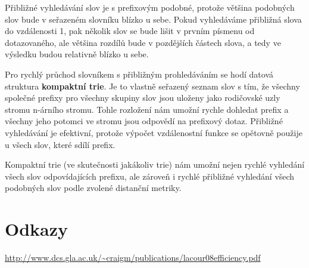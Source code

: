 \documentclass[11pt]{article}
\begin{document}
Přibližné vyhledávání slov je s prefixovým podobné, protože většina podobných
slov bude v seřazeném slovníku blízko u sebe. Pokud vyhledáváme přibližná slova
do vzdálenosti 1, pak několik slov se bude lišit v prvním písmenu od
dotazovaného, ale většina rozdílů bude v pozdějších částech slova, a tedy ve
výsledku budou relativně blízko u sebe.

Pro rychlý průchod slovníkem s přibližným prohledáváním se hodí datová
struktura \textbf{kompaktní trie}. Je to vlastně seřazený seznam slov s tím, že
všechny společné prefixy pro všechny skupiny slov jsou uloženy jako rodičovské
uzly stromu n-árního stromu. Tohle rozložení nám umožní rychle dohledat prefix
a všechny jeho potomci ve stromu jsou odpovědí na prefixový dotaz. Přibližné
vyhledávání je efektivní, protože výpočet vzdálenostní funkce se opětovně
použije u všech slov, které sdílí prefix.

Kompaktní trie (ve skutečnosti jakákoliv trie) nám umožní nejen rychlé
vyhledání všech slov odpovídajících prefixu, ale zároveň i rychlé přibližné
vyhledání všech podobných slov podle zvolené distanční metriky.


\section{Odkazy}
\url{http://www.dcs.gla.ac.uk/~craigm/publications/lacour08efficiency.pdf}


\end{document}
